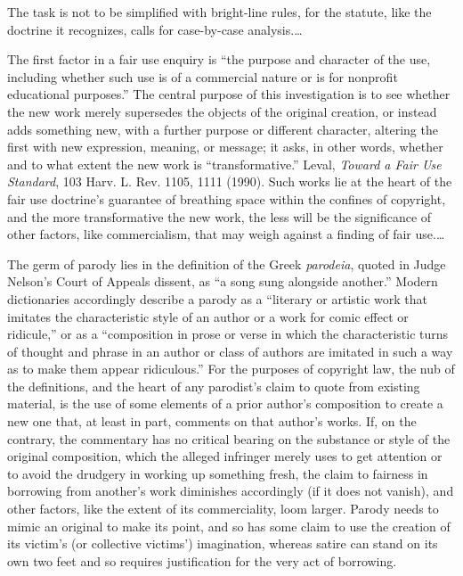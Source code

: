 The task is not to be simplified with bright-line rules, for the statute, like
the doctrine it recognizes, calls for case-by-case
analysis.\ldots\unskip{}


The first factor in a fair use enquiry is ``the purpose and character of the
use, including whether such use is of a commercial nature or is for nonprofit
educational purposes.'' The central purpose of
this investigation is to see whether the new work
merely supersedes the objects of the original creation,
or instead adds something new, with a further
purpose or different character, altering the first with new expression, meaning,
or message; it asks, in other words, whether and to what extent the new work is
``transformative.'' Leval, \emph{Toward a Fair Use Standard}, 103 Harv. L. Rev.
1105, 1111 (1990). Such works lie
at the heart of the fair use doctrine's guarantee of breathing space within the
confines of copyright, and the more transformative the new work, the less
will be the significance of other factors, like commercialism, that may weigh
against a finding of fair use.\ldots

The germ of parody lies in the definition of the Greek \textit{parodeia}, quoted
in Judge Nelson's Court of Appeals dissent, as ``a song sung alongside
another.''
Modern dictionaries accordingly describe a parody as a ``literary or
artistic work that imitates the characteristic style of an author or a work for
comic effect or ridicule,'' or as a ``composition in prose or verse in which the
characteristic
turns of thought and phrase in an author or class of authors are imitated in
such a way as to make them appear ridiculous.'' For the purposes of copyright
law, the nub of the
definitions, and the heart of any parodist's claim to quote from existing
material, is the use of some elements of a prior author's composition to create
a new one that, at least in part, comments on that author's works.
If, on the contrary,
the commentary has no critical bearing on the substance or style of the original
composition, which the alleged infringer merely uses to get attention or to
avoid the drudgery in working up something fresh, the claim to fairness in
borrowing from another's work diminishes accordingly (if it does not vanish),
and other factors, like the extent of its commerciality, loom
larger. Parody needs
to mimic an original to make its point, and so has some claim to use the
creation of its victim's (or collective victims') imagination, whereas satire
can stand on its own two feet and so requires justification for the very act of
borrowing.


